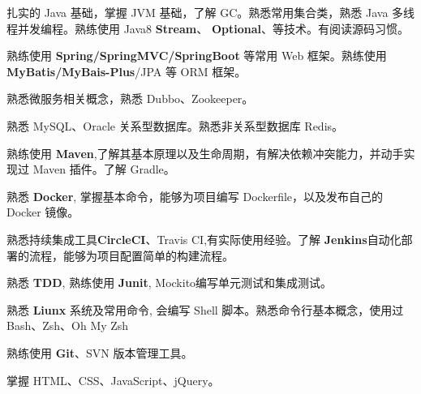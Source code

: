 



\begin{cventries}
  \cventry
    {} %
    {} %
    {} %
    {} %
    {
      \begin{cvitems} %
        \item {扎实的 Java 基础，掌握 JVM 基础，了解 GC。熟悉常⽤集合类，熟悉 Java 多线程并发编程。熟练使用 Java8 \textbf{Stream}、 \textbf{Optional}、等技术。有阅读源码习惯。}
        \item {熟练使用 \textbf{Spring/SpringMVC/SpringBoot} 等常用 Web 框架。熟练使用 \textbf{MyBatis/MyBais-Plus}/JPA 等 ORM 框架。}
        \item {熟悉微服务相关概念，熟悉 Dubbo、Zookeeper。}
        \item {熟悉 MySQL、Oracle 关系型数据库。熟悉非关系型数据库 Redis。}
        \item {熟练使用 \textbf{Maven},了解其基本原理以及生命周期，有解决依赖冲突能力，并动手实现过 Maven 插件。了解 Gradle。}
        \item {熟悉 \textbf{Docker}, 掌握基本命令，能够为项目编写 Dockerfile，以及发布自己的 Docker 镜像。}
        \item {熟悉持续集成工具\textbf{CircleCI}、Travis CI,有实际使用经验。了解 \textbf{Jenkins}自动化部署的流程，能够为项目配置简单的构建流程。}
        \item {熟悉 \textbf{TDD}, 熟练使用 \textbf{Junit}, Mockito编写单元测试和集成测试。}
        \item {熟悉 \textbf{Liunx} 系统及常用命令, 会编写 Shell 脚本。熟悉命令行基本概念，使用过 Bash、Zsh、Oh My Zsh}
        \item {熟练使用 \textbf{Git}、SVN 版本管理工具。}
        \item {掌握 HTML、CSS、JavaScript、jQuery。}
      \end{cvitems}
    }

\end{cventries}
